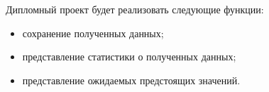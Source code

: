 Дипломный проект будет реализовать следующие функции:
\begin{itemize}
    \item сохранение полученных данных;
    \item представление статистики о полученных данных;
    \item представление ожидаемых предстоящих значений.
\end{itemize}








